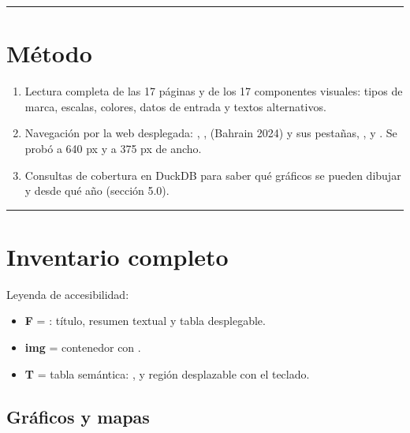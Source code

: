 \medskip\noindent\textcolor{muted!40}{\rule{\linewidth}{0.3pt}}\medskip

\section{Método}

\begin{enumerate}
\item Lectura completa de las 17 páginas y de los 17 componentes visuales: tipos de marca, escalas, colores, datos de entrada y textos alternativos.
\item Navegación por la web desplegada: , ,  (Bahrain 2024) y sus pestañas, ,  y . Se probó a 640 px y a 375 px de ancho.
\item Consultas de cobertura en DuckDB para saber qué gráficos se pueden dibujar y desde qué año (sección 5.0).
\end{enumerate}

\medskip\noindent\textcolor{muted!40}{\rule{\linewidth}{0.3pt}}\medskip

\section{Inventario completo}

Leyenda de accesibilidad:

\begin{itemize}
\item \textbf{F} = : título, resumen textual y tabla desplegable.
\item \textbf{img} = contenedor  con .
\item \textbf{T} = tabla semántica: ,  y región desplazable con el teclado.
\end{itemize}

\subsection{Gráficos y mapas}

